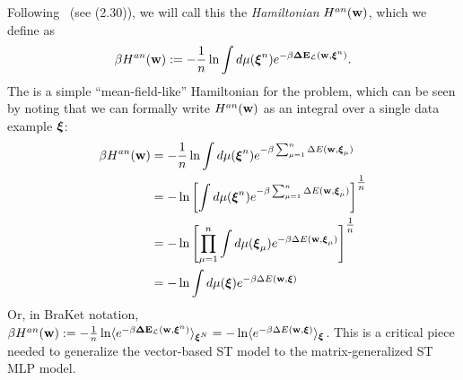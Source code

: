 Following~\cite{SST92} (see \EQN(2.30)), we will call this the \emph{\Annealed Hamiltonian} $H^{an}({\mathbf{w}})$, 
which we define as  %
  \begin{align}
   \label{eqn:Gan_def}
   \beta H^{an}({\mathbf{w}}):= - \frac{1}{n}\ln  \int d\mu(\boldsymbol{\xi}^{n})e^{-\beta\mathbf{\Delta {E}}_{\mathcal{L}}(\mathbf{w}, \boldsymbol{\xi}^{n})}.
  \end{align}
  The \AnnealedHamiltonian is a simple ``mean-field-like'' Hamiltonian for the problem, which
  can be seen by noting that we can formally write $H^{an}({\mathbf{w}})$ as an integral over a single data example $\boldsymbol{\xi}$:
 \begin{align}
   \label{eqn:Gan_simplified}
   \beta H^{an}({\mathbf{w}}) &=  - \frac{1}{n}\ln  \int d\mu(\boldsymbol{\xi}^{n})e^{-\beta\sum_{\mu=1}^{n}\Delta E({\mathbf{w}},\boldsymbol{\xi}_{\mu})} \\ \nonumber
   &=  - \ln \left[\int d\mu(\boldsymbol{\xi}^{n})e^{-\beta\sum_{\mu=1}^{n}\Delta E({\mathbf{w}},\boldsymbol{\xi}_{\mu})}\right]^{\tfrac{1}{n}} \\ \nonumber
   &=  - \ln \left[\prod_{\mu=1}^{n}\int d\mu(\boldsymbol{\xi}_{\mu})e^{-\beta\Delta E({\mathbf{w}},\boldsymbol{\xi}_{\mu})}\right]^{\tfrac{1}{n}} \\ \nonumber
   &=  - \ln  \int d\mu(\boldsymbol{\xi})e^{-\beta\Delta E({\mathbf{w}},\boldsymbol{\xi})}
 \end{align}
 Or, in BraKet notation,
 $\beta H^{an}({\mathbf{w}}):=  -\tfrac{1}{n}\ln\langle e^{-\beta\mathbf{\Delta {E}}_{\mathcal{L}}(\mathbf{w}, \boldsymbol{\xi}^{n})}\rangle_{\boldsymbol{\xi}^{N}}=  -\ln \langle e^{-\beta\Delta E({\mathbf{w}},\boldsymbol{\xi})}\rangle_{\boldsymbol{\xi}}$.
This is a critical piece needed to generalize the vector-based ST \Perceptron model to the matrix-generalized ST MLP model.

